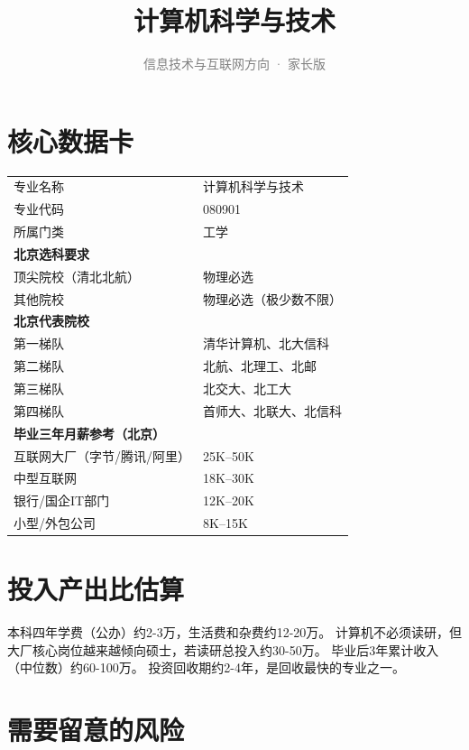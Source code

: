 \documentclass[a4paper,12pt]{ctexart}
\title{\textcolor{blue!70!black}{\Huge\textbf{计算机科学与技术}}}
\subtitle{\textcolor{gray}{信息技术与互联网方向 · 家长版}}
\author{}
\date{}
\begin{document}
\maketitle
\thispagestyle{empty}

\section{核心数据卡}

\begin{tabular}{ll}
\toprule
专业名称 & 计算机科学与技术 \\
专业代码 & 080901 \\
所属门类 & 工学 \\
\midrule
\multicolumn{2}{l}{\textbf{北京选科要求}} \\
\quad 顶尖院校（清北北航） & 物理必选 \\
\quad 其他院校 & 物理必选（极少数不限） \\
\midrule
\multicolumn{2}{l}{\textbf{北京代表院校}} \\
\quad 第一梯队 & 清华计算机、北大信科 \\
\quad 第二梯队 & 北航、北理工、北邮 \\
\quad 第三梯队 & 北交大、北工大 \\
\quad 第四梯队 & 首师大、北联大、北信科 \\
\midrule
\multicolumn{2}{l}{\textbf{毕业三年月薪参考（北京）}} \\
\quad 互联网大厂（字节/腾讯/阿里） & 25K--50K \\
\quad 中型互联网 & 18K--30K \\
\quad 银行/国企IT部门 & 12K--20K \\
\quad 小型/外包公司 & 8K--15K \\
\bottomrule
\end{tabular}

\section{投入产出比估算}

本科四年学费（公办）约2-3万，生活费和杂费约12-20万。
计算机不必须读研，但大厂核心岗位越来越倾向硕士，若读研总投入约30-50万。
毕业后3年累计收入（中位数）约60-100万。
投资回收期约2-4年，是回收最快的专业之一。

\section{需要留意的风险}
\end{document}
